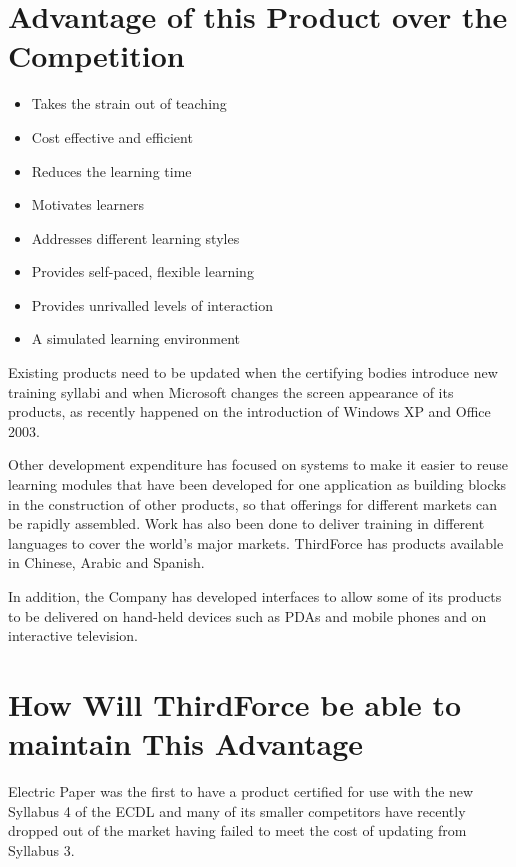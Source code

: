 \documentclass[a4paper,12pt]{article}
\begin{document}
\section*{Advantage of this Product over the \\ Competition}

\begin{itemize}

\item Takes the strain out of teaching
\item Cost effective and efficient
\item Reduces the learning time
\item Motivates learners
\item Addresses different learning styles
\item Provides self-paced, flexible learning
\item Provides unrivalled levels of interaction
\item A simulated learning environment

\end{itemize}

Existing products need to be updated when the certifying bodies
introduce new training syllabi and when Microsoft changes the screen
appearance of its products, as recently happened on the introduction of
Windows XP and Office 2003.

Other development expenditure has focused on systems to make it easier
to reuse learning modules that have been developed for one application
as building blocks in the construction of other products, so that
offerings for different markets can be rapidly assembled. Work has also
been done to deliver training in different languages to cover the
world's major markets. ThirdForce has products available in Chinese,
Arabic and Spanish.
	
In addition, the Company has developed interfaces to allow some of
its products to be delivered on hand-held devices such as PDAs and
mobile phones and on interactive television.

\section*{How Will ThirdForce be able to maintain This Advantage}

Electric Paper was the first to have a product certified for use with
the new Syllabus 4 of the ECDL and many of its smaller competitors
have recently dropped out of the market having failed to meet the
cost of updating from Syllabus 3.
\end{document}
